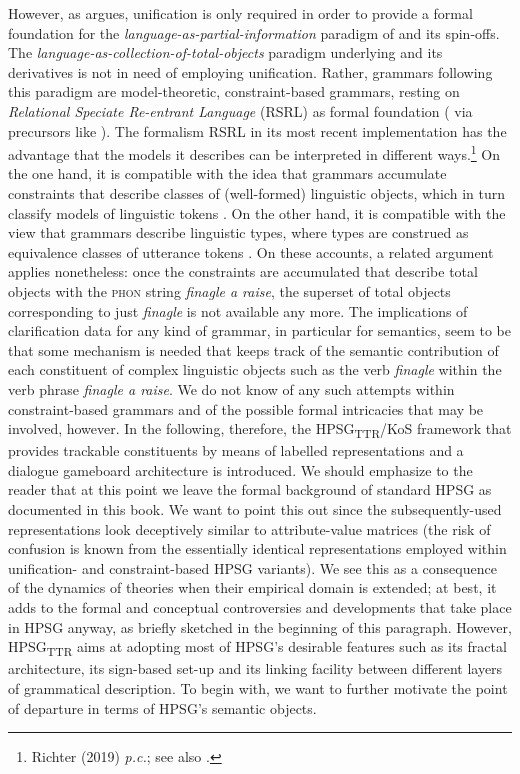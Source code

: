 \documentclass[output=paper
 	        ,biblatex
                ,babelshorthands
                ,newtxmath
                ,draftmode
                ,colorlinks, citecolor=brown
]{langscibook}
\begin{document}
However, as \citet[Chapter 2]{Richter:2000} argues, unification is only required in order to provide a formal foundation for the \textit{language-as-partial-information} paradigm of \citet{Pollard:Sag:1987} and its spin-offs. 
%
The \textit{language-as-collection-of-total-objects} paradigm underlying \citet{Pollard:Sag:1994} and its derivatives is not in need of employing unification.
%
Rather, grammars following this paradigm are model-theoretic, constraint-based grammars, resting on \emph{Relational Speciate Re-entrant Language} (RSRL) as formal foundation (\citealt{Richter:2000} via precursors like \citealt{Penn:1999}).
%
The formalism RSRL in its most recent implementation \citep{Richter:2004} has the advantage that the models it describes can be interpreted in different ways.\footnote{Richter (2019) \textit{p.c.}; see also .}
%
On the one hand, it is compatible with the idea that grammars accumulate constraints that describe classes of (well-formed) linguistic objects, which in turn classify models of linguistic tokens
\citep{King:1999}.
%
On the other hand, it is compatible with the view that grammars describe linguistic types, where types are construed as equivalence classes of utterance tokens \citep{Pollard:1999}.
%
On these accounts, a related argument applies nonetheless: once the constraints are accumulated that describe total objects with the \textsc{phon} string \textit{finagle a raise}, the superset of total objects corresponding to just \textit{finagle} is not available any more.
%
The implications of clarification data for any kind of grammar, in particular for semantics, seem to be that some mechanism is needed that keeps track of the semantic contribution of each constituent of complex linguistic objects such as the verb \textit{finagle} within the verb phrase \textit{finagle a raise}.
%
We do not know of any such attempts within constraint-based grammars and of the possible formal intricacies that may be involved, however.
%
In the following, therefore, the HPSG\textsubscript{TTR}/KoS framework that provides trackable constituents by means of labelled representations and a dialogue gameboard architecture is introduced.
%
We should emphasize to the reader that at this point we leave the formal background of standard HPSG as documented in this book.
%
We want to point this out since the subsequently-used representations look deceptively similar to attribute-value matrices (the risk of confusion is known from the essentially identical representations employed within unification- and constraint-based HPSG variants).
%
We see this as a consequence of the dynamics of theories when their empirical domain is extended; at best, it adds to the formal and conceptual controversies and developments that take place in HPSG anyway, as briefly sketched in the beginning of this paragraph. 
%
However, HPSG\textsubscript{TTR} aims at adopting most of HPSG's desirable features such as its fractal architecture, its sign-based set-up and its linking facility between different layers of grammatical description. 
%
To begin with, we want to further motivate the point of departure in terms of HPSG's semantic objects.
\end{document}
